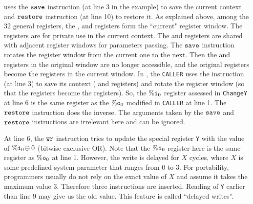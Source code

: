 \sparc{} uses the $\texttt{save}$ instruction (at line 3 in the example)
to save the current context
and $\texttt{restore}$ instruction (at line 10) to restore it.
As explained above, among the 32 general registers,
the \outRN{}, \localRN{} and \inRN{} registers form the
``current" register window.
The \localRN{} registers are for private use in the current context.
The \inRN{} and \outRN{} registers are shared with adjacent register windows
for parameters passing.
The $\texttt{save}$ instruction rotates the register window from the
current one to the next. Then the \localRN{} and \inRN{}
registers in the original window are no longer accessible,
and the original \outRN{} registers become the \inRN{} registers
in the current window.
In \Fig{\ref{fig:An Example for SPARC Code}},
the \texttt{CALLER} uses the \csave{} instruction 
(at line 3) to save its context
(\localRN{} and \inRN{} registers) and rotate the
register window (so that the 
\outRN{} registers become the \inRN{} registers).
So, the $\%\texttt{i}_{0}$ register
assessed in \texttt{ChangeY} at line 6 is
the same register as the $\%\texttt{o}_{0}$ modified in
\texttt{CALLER} at line 1.
The $\texttt{restore}$ instruction does the inverse.
The arguments taken by the $\texttt{save}$ and  $\texttt{restore}$ instructions
are irrelevant here and can be ignored.


At line 6, the $\texttt{wr}$ instruction tries to
update the special register {\tt Y}
with the value of $\%\texttt{i}_{0} \! \oplus 0$
(bitwise exclusive OR).
Note that the $\%\texttt{i}_{0}$
register here is the same register as $\%\texttt{o}_{0}$ at line 1.
However, the write is delayed for $X$ cycles,
where $X$ is some predefined system parameter
that ranges from 0 to 3.
For portability, programmers usually do not rely
on the exact value of $X$ and assume it takes
the maximum value 3.
Therefore three \nop{} instructions
are inserted.
Reading of {\tt Y} earlier than line 9
may give us the old value.
This feature is called ``delayed writes''.

